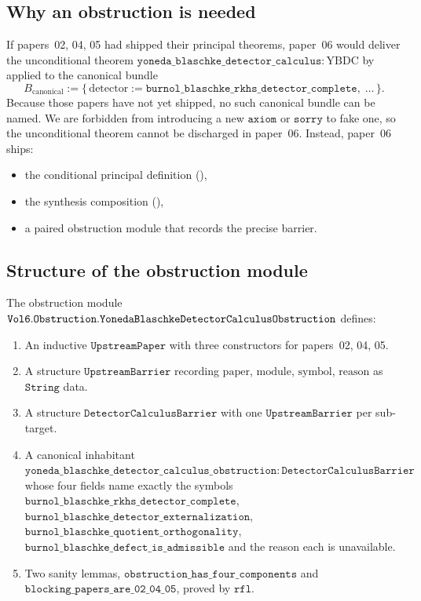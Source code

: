 \documentclass[12pt]{article}
\theoremstyle{plain}
\theoremstyle{definition}
\theoremstyle{remark}
\newcommand{\YBDC}{\mathrm{YBDC}}
\begin{document}
\subsection{Why an obstruction is needed}

If papers~02, 04, 05 had shipped their principal theorems, paper~06
would deliver the unconditional theorem
\(\mathtt{yoneda\_blaschke\_detector\_calculus} : \YBDC\) by
 applied to the canonical bundle
\[
  B_{\text{canonical}} :=
   \bigl\{\,\mathrm{detector} :=
     \mathtt{burnol\_blaschke\_rkhs\_detector\_complete},\;\ldots\,\bigr\}.
\]
Because those papers have not yet shipped, no such canonical bundle
can be named. We are forbidden from introducing a new
\(\mathtt{axiom}\) or \(\mathtt{sorry}\) to fake one, so the
unconditional theorem cannot be discharged in paper~06. Instead,
paper~06 ships:
\begin{itemize}
  \item the conditional principal definition
        (),
  \item the synthesis composition
        (),
  \item a paired obstruction module that records the precise barrier.
\end{itemize}

\subsection{Structure of the obstruction module}

The obstruction module
\(\mathtt{Vol6.Obstruction.Yoneda\-Blaschke\-Detector\-Calculus\-%
Obstruction}\) defines:

\begin{enumerate}
  \item An inductive \(\mathtt{UpstreamPaper}\) with three constructors
        for papers~02, 04, 05.
  \item A structure \(\mathtt{UpstreamBarrier}\) recording
        \(\mathrm{paper}\), \(\mathrm{module}\), \(\mathrm{symbol}\),
        \(\mathrm{reason}\) as \(\mathtt{String}\) data.
  \item A structure \(\mathtt{DetectorCalculusBarrier}\) with one
        \(\mathtt{UpstreamBarrier}\) per sub-target.
  \item A canonical inhabitant
        \(\mathtt{yoneda\_blaschke\_detector\_calculus\_obstruction}
        : \mathtt{DetectorCalculusBarrier}\) whose four fields name
        exactly the symbols
        \(\mathtt{burnol\_blaschke\_rkhs\_detector\_complete}\),
        \(\mathtt{burnol\_blaschke\_detector\_externalization}\),
        \(\mathtt{burnol\_blaschke\_quotient\_orthogonality}\),
        \(\mathtt{burnol\_blaschke\_defect\_is\_admissible}\) and
        the reason each is unavailable.
  \item Two sanity lemmas, \(\mathtt{obstruction\_has\_four\_components}\)
        and \(\mathtt{blocking\_papers\_are\_02\_04\_05}\), proved by
        \(\mathtt{rfl}\).
\end{enumerate}
\end{document}
